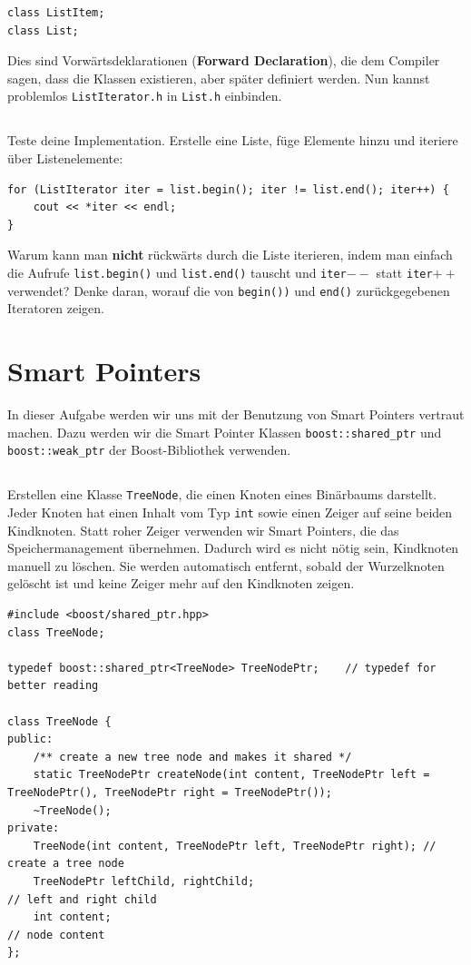\begin{lstlisting}
class ListItem;
class List;
\end{lstlisting}

Dies sind Vorwärtsdeklarationen (\textbf{Forward Declaration}), die dem Compiler sagen, dass die Klassen existieren, aber später definiert werden. Nun kannst problemlos \texttt{ListIterator.h} in \texttt{List.h} einbinden.

\subsection{}
Teste deine Implementation.
Erstelle eine Liste, füge Elemente hinzu und iteriere über Listenelemente:

\begin{lstlisting}
for (ListIterator iter = list.begin(); iter != list.end(); iter++) {
	cout << *iter << endl;
}
\end{lstlisting}

Warum kann man \textbf{nicht} rückwärts durch die Liste iterieren, indem man einfach die Aufrufe \texttt{list.begin()} und \texttt{list.end()} tauscht und \texttt{iter$--$} statt \texttt{iter$++$} verwendet?
Denke daran, worauf die von \texttt{begin())} und \texttt{end()} zurückgegebenen Iteratoren zeigen.




\newpage

\section{Smart Pointers}
In dieser Aufgabe werden wir uns mit der Benutzung von Smart Pointers vertraut machen. Dazu werden wir die Smart Pointer Klassen \texttt{boost::shared\_ptr} und \texttt{boost::weak\_ptr} der Boost-Bibliothek verwenden.

\subsection{}
Erstellen eine Klasse \texttt{TreeNode}, die einen Knoten eines Binärbaums darstellt.
Jeder Knoten hat einen Inhalt vom Typ \texttt{int} sowie einen Zeiger auf seine beiden Kindknoten.
Statt \glqq roher\grqq{} Zeiger verwenden wir Smart Pointers, die das Speichermanagement übernehmen.
Dadurch wird es nicht nötig sein, Kindknoten manuell zu löschen.
Sie werden automatisch entfernt, sobald der Wurzelknoten gelöscht ist und keine Zeiger mehr auf den Kindknoten zeigen.

\begin{lstlisting}
#include <boost/shared_ptr.hpp>
class TreeNode;

typedef boost::shared_ptr<TreeNode> TreeNodePtr;	// typedef for better reading

class TreeNode {
public:
	/** create a new tree node and makes it shared */
	static TreeNodePtr createNode(int content, TreeNodePtr left = TreeNodePtr(), TreeNodePtr right = TreeNodePtr());
	~TreeNode();
private:
	TreeNode(int content, TreeNodePtr left, TreeNodePtr right);	// create a tree node
	TreeNodePtr leftChild, rightChild;									// left and right child
	int content;																// node content
};
\end{lstlisting}

